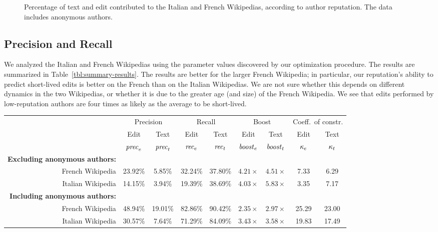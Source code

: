 \begin{figure}
\begin{center}

\end{center}
\caption[Text and edit contributions by reputation]{%
  Percentage of text and edit contributed to the
  Italian and French Wikipedias, according to author reputation.
  The data includes anonymous authors.}
\label{fig:user-breakdown-by-rep}
\end{figure}


\subsection{Precision and Recall}

We analyzed the Italian and French Wikipedias using the
parameter values discovered by our optimization procedure.
The results are summarized in Table~\ref{tbl:summary-results}.
The results are better for the larger French Wikipedia; in particular,
our reputation's ability to predict short-lived edits is better on the
French than on the Italian Wikipedias.
We are not sure whether this depends on different dynamics in the two
Wikipedias, or whether it is due to the greater age (and size) of the
French Wikipedia.
We see that edits performed by low-reputation authors are four times
as likely as the average to be short-lived.

\begin{sidewaystable}[tp]
\begin{center}
\begin{tabular}{|r||c|c||c|c||c|c||c|c|} \hline
 & \multicolumn{2}{|c||}{Precision}
 & \multicolumn{2}{|c||}{Recall}
 & \multicolumn{2}{|c||}{Boost}
 & \multicolumn{2}{|c|}{Coeff.\ of constr.} \\
 & Edit & Text & Edit & Text  & Edit & Text & Edit & Text \\
 & ${\text{\textit{prec}}}_e$ & ${\text{\textit{prec}}}_t$ & ${\text{\textit{rec}}}_e$ & ${\text{\textit{rec}}}_t$ & ${\text{\textit{boost}}}_e$ & ${\text{\textit{boost}}}_t$
 & $\kappa_e$ & $\kappa_t$ \\[0.5ex] \hline
\textbf{Excluding anonymous authors: \quad} & & & & & & & & \\
\qquad French Wikipedia          & 23.92\% &  5.85\% & 32.24\% & 37.80\% & $4.21\times$ & $4.51\times$ &  7.33 &  6.29 \\
\qquad Italian Wikipedia         & 14.15\% &  3.94\% & 19.39\% & 38.69\% & $4.03\times$ & $5.83\times$ &  3.35 &  7.17 \\ \hline
\textbf{Including anonymous authors: \quad} & & & & & & & & \\
\qquad French Wikipedia          & 48.94\% & 19.01\% & 82.86\% & 90.42\% & $2.35\times$ & $2.97\times$ & 25.29 & 23.00 \\
\qquad Italian Wikipedia         & 30.57\% &  7.64\% & 71.29\% & 84.09\% & $3.43\times$ & $3.58\times$ & 19.83 & 17.49 \\ \hline
\end{tabular}
\end{center}
\caption[Evaluation of WikiTrust on Italian and French Wikipedias]
  {Summary of the performance of content-driven reputation for
  the Italian and French Wikipedias.}
\label{tbl:summary-results}
\end{sidewaystable}


